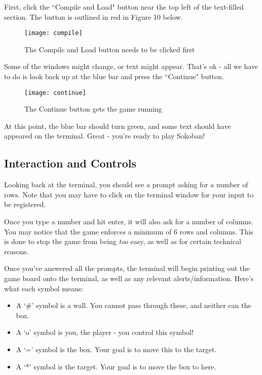 \documentclass{article}
\begin{document}
First, click the ``Compile and Load" button near the top left of the text-filled section.
The button is outlined in red in Figure 10 below.

\begin{figure}[ht]
    \centering
    \texttt{[image: compile]}
    \caption{The Compile and Load button needs to be clicked first}
\end{figure}

Some of the windows might change, or text might appear. That's ok - all we have to do
is look back up at the blue bar and press the ``Continue" button.

\begin{figure}[ht]
    \centering
    \texttt{[image: continue]}
    \caption{The Continue button gets the game running}
\end{figure}

At this point, the blue bar should turn green, and some text should have appeared on
the terminal. Great - you're ready to play Sokoban!

\subsection{Interaction and Controls}

Looking back at the terminal, you should see a prompt asking for a number of rows.
Note that you may have to click on the terminal window for your input to be registered.

Once you type a number and hit enter, it will also ask for a number of columns.
You may notice that the game enforces a minimum of 6 rows and columns.
This is done to stop the game from being \textit{too} easy, as well as for certain
technical reasons.

Once you've answered all the prompts, the terminal will begin printing out the game board
onto the terminal, as well as any relevant alerts/information. Here's what each symbol means:

\begin{itemize}
    \item A `\#' symbol is a wall. You cannot pass through these, and neither can the box.
    \item A `o' symbol is you, the player - you control this symbol!
    \item A `=' symbol is the box. Your goal is to move this to the target.
        \nopagebreak
    \item A `*' symbol is the target. Your goal is to move the box to here.
\end{itemize}
\end{document}
